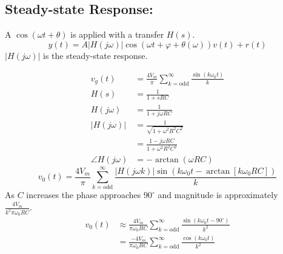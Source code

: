 \documentclass[a5paper]{article}
\begin{document}
	\subsection{Steady-state Response:}
	A $\cos{(\omega t+\theta)}$ is applied with a transfer $H(s)$.
	$$y(t)=A|H(j\omega)|\cos{(\omega t+\varphi+\theta(\omega))}v(t)+r(t)$$
	$|H(j\omega)|$ is the steady-state response.
	\begin{center}
	\end{center}
	\begin{align*}
		v_{g}(t)&=\frac{4V_{m}}{\pi}\sum^{\infty}_{k=\text{odd}}\frac{\sin{(k\omega_{0}t)}}{k}\\
		H(s)&=\frac{1}{1+sRC}\\
		H(j\omega)&=\frac{1}{1+j\omega RC}\\
		|H(j\omega)|&=\frac{1}{\sqrt{1+\omega^{2}R^{2}C^{2}}}\\
		&=\frac{1-j\omega RC}{1+\omega^{2}R^{2}C^{2}}\\
		\angle H(j\omega)&=-\arctan{(\omega RC)}
	\end{align*}
	$$v_{0}(t)=\frac{4V_{m}}{\pi}\sum^{\infty}_{k=\text{odd}}\frac{|H(j\omega k)|\sin{(k\omega_{0}t-\arctan{[k\omega_{0}RC]})}}{k}$$
	As $C$ increases the phase approaches $90^{\circ}$ and magnitude is approximately\\$\frac{4V_{m}}{k^{2}\pi\omega_{0}RC}$.
	\begin{align*}
		v_{0}(t)&\approx\frac{4V_{m}}{\pi\omega_{0}RC}\sum^{\infty}_{k=\text{odd}}\frac{\sin{(k\omega_{0}t-90^{\circ})}}{k^{2}}\\
		&=\frac{-4V_{m}}{\pi\omega_{0}RC}\sum^{\infty}_{k=\text{odd}}\frac{\cos{(k\omega_{0}t)}}{k^{2}}
	\end{align*}
\end{document}
